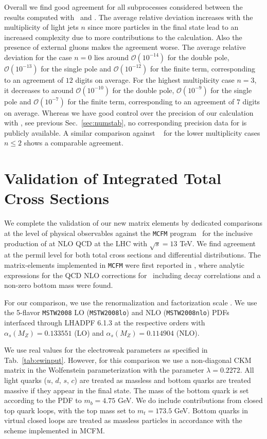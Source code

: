 Overall we find good agreement for all subprocesses considered between the
results computed with \recola~and \BlackHat{}. The average relative deviation increases
with the multiplicity of light jets $n$ since more particles in the final
state lead to an increased complexity due to more contributions to the calculation. Also the presence of external
gluons makes the agreement worse. The average relative
deviation for the case $n=0$ lies around $\mathcal{O}(10^{-14})$ for the double pole,
$\mathcal{O}(10^{-13})$ for the single pole and
$\mathcal{O}(10^{-12})$ for the finite term,
corresponding to an agreement of $12$ digits on average. For the
highest multiplicity case $n=3$, it decreases to around $\mathcal{O}(10^{-10})$ for the double pole,
$\mathcal{O}(10^{-9})$ for the single pole and
$\mathcal{O}(10^{-7})$ for the finite term,
corresponding to an agreement of $7$ digits on average. Whereas we have good control over the precision of our calculation with \BlackHat{}, see previous Sec.~\ref{sec:numstab}, no corresponding precision data for \recola{} is publicly available. A similar comparison against
\OL~\cite{Cascioli:2011va} for the lower
multiplicity cases $n\leq 2$ shows a comparable agreement.


\section{Validation of Integrated Total Cross Sections}
We complete the validation of our new matrix elements by dedicated comparisons at the level of physical observables
against the \texttt{MCFM} program~\cite{mcfm7} for the inclusive production of \Wbb{}
at NLO QCD at the LHC with $\sqrt{s}=13$ TeV. We find agreement at the
permil level for both total cross sections and differential
distributions. The matrix-elements
implemented in \texttt{MCFM} were first reported
in \cite{Badger:2010mg}, where analytic expressions for the QCD NLO
corrections for \Wbb~including decay correlations and a non-zero
bottom mass were found.


For our comparison, we use the renormalization and
factorization scale \murf[M_W]. We use the 5-flavor \texttt{MSTW2008} LO (\texttt{MSTW2008lo}) and NLO (\texttt{MSTW2008nlo})
PDFs~\cite{MSTW08} interfaced through LHADPF 6.1.3 \cite{LHAPDF} at the respective orders with $\alpha_s(M_Z) = 0.133551$ (LO) and $\alpha_s(M_Z) = 0.114904$ (NLO).


We use real values for the electroweak
parameters as specified in Tab.~\ref{tab:ewinput}. However, for this
comparison we use a non-diagonal CKM
matrix in the Wolfenstein parameterization \cite{WoCKM} with the
parameter $\lambda=0.2272$.  All light quarks ($u$, $d$, $s$, $c$) are treated as massless and
bottom quarks are treated massive if they appear in the final
state. The mass of the bottom quark is set according to the PDF to
$m_b=4.75$ GeV. We do include contributions from closed top quark loops, with the top mass
set to $m_t=173.5$ GeV. Bottom quarks in virtual closed loops are
treated as massless particles in accordance with the scheme implemented in MCFM.

